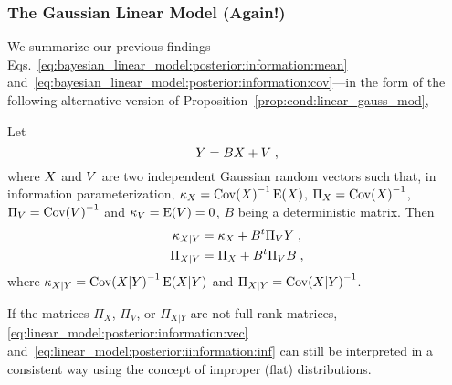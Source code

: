 \subsubsection{The Gaussian Linear Model (Again!)}
We summarize our previous findings---Eqs.~\eqref{eq:bayesian_linear_model:posterior:information:mean}
and~\eqref{eq:bayesian_linear_model:posterior:information:cov}---in the
form of the following alternative version of
Proposition~\ref{prop:cond:linear_gauss_mod},

\begin{prop}
  \label{prop:cond:linear_gauss_mod:inf}
  Let
  \[
    Y = B X + V \; ,
  \]
  where $X$ and $V$ are two independent Gaussian random vectors such that, in
  information parameterization, $\kappa_X = {\operatorname{Cov}(X)}^{-1}\operatorname{E}(X)$, $\Pi_X =
  {\operatorname{Cov}(X)}^{-1}$, $\Pi_V = {\operatorname{Cov}(V)}^{-1}$ and $\kappa_V = \operatorname{E}(V)=0$, $B$
  being a deterministic matrix. Then
  \begin{align}
    \label{eq:linear_model:posterior:information:vec}
    \kappa_{X|Y} & = \kappa_X + B^t \Pi_V Y \; , \\
    \label{eq:linear_model:posterior:iinformation:inf}
    \Pi_{X|Y} & = \Pi_{X} + B^t \Pi_V B \; ,
  \end{align}
  where $\kappa_{X|Y} = {\operatorname{Cov}(X|Y)}^{-1}\operatorname{E}(X|Y)$ and $\Pi_{X|Y} =
  {\operatorname{Cov}(X|Y)}^{-1}$.

  If the matrices $\Pi_X$, $\Pi_V$, or $\Pi_{X|Y}$ are not full rank matrices,
  \eqref{eq:linear_model:posterior:information:vec}
  and~\eqref{eq:linear_model:posterior:iinformation:inf} can still be
  interpreted in a consistent way
  using the concept of improper (flat) distributions.
\end{prop}

